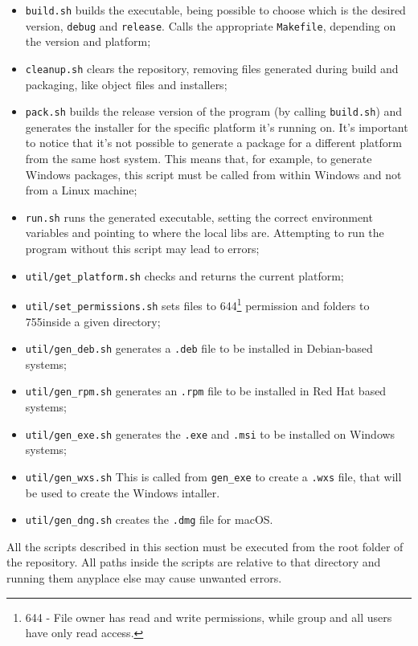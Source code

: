 \begin{itemize}
    \item \texttt{build.sh} builds the executable, being possible to choose which is the desired version, \texttt{debug} and \texttt{release}. Calls the appropriate \texttt{Makefile}, depending on the version and platform;
    \item \texttt{cleanup.sh} clears the repository, removing files generated during build and packaging, like object files and installers;
    \item \texttt{pack.sh} builds the release version of the program (by calling \texttt{build.sh}) and generates the installer for the specific platform it's running on. It's important to notice that it's not possible to generate a package for a different platform from the same host system. This means that, for example, to generate Windows packages, this script must be called from within Windows and not from a Linux machine;
    \item \texttt{run.sh} runs the generated executable, setting the correct environment variables and pointing to where the local libs are. Attempting to run the program without this script may lead to errors;
    \item \texttt{util/get\_platform.sh} checks and returns the current platform;
    \item \texttt{util/set\_permissions.sh} sets files to 644\footnote{644 - File owner has read and write permissions, while group and all users have only read access.} permission and folders to 755\footnotemark inside a given directory;
    \item \texttt{util/gen\_deb.sh} generates a \texttt{.deb} file to be installed in Debian-based systems;
    \item \texttt{util/gen\_rpm.sh} generates an \texttt{.rpm} file to be installed in Red Hat based systems;
    \item \texttt{util/gen\_exe.sh} generates the \texttt{.exe} and \texttt{.msi} to be installed on Windows systems;
    \item \texttt{util/gen\_wxs.sh} This is called from \texttt{gen\_exe} to create a \texttt{.wxs} file, that will be used to create the Windows intaller.
    \item \texttt{util/gen\_dng.sh} creates the \texttt{.dmg} file for macOS.
\end{itemize}


All the scripts described in this section must be executed from the root folder of the repository. All paths inside the scripts are relative to that directory and running them anyplace else may cause unwanted errors.

